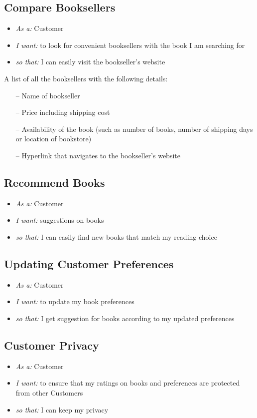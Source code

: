 \documentclass{article}
\begin{document}
\subsection{Compare Booksellers}
\begin{itemize}
\item \emph{As a:} Customer
\item \emph{I want:}  to look for convenient booksellers with the book I am searching for
\item \emph{so that:}  I can easily visit the bookseller’s website
\end{itemize}


A list of all the booksellers with the following details:
\begin{itemize}
	\item[--] Name of bookseller
	\item[--] Price including shipping cost
	\item[--] Availability of the book (such as number of books, number of shipping days or location of bookstore)
	\item[--]  Hyperlink that navigates to the bookseller’s website
\end{itemize}

\subsection{Recommend Books}
\begin{itemize}
\item \emph{As a:} Customer
\item \emph{I want:} suggestions on books 
\item \emph{so that:} I can easily find new books that match my reading choice
\end{itemize}

\subsection{Updating Customer Preferences}
\begin{itemize}
\item \emph{As a:} Customer
\item \emph{I want:} to update my book preferences 
\item \emph{so that:} I get suggestion for books according to my updated preferences
\end{itemize}

\subsection{Customer Privacy}
\begin{itemize}
\item \emph{As a:} Customer
\item \emph{I want:}  to ensure that my ratings on books and preferences are protected from other Customers
\item \emph{so that:} I can keep my privacy
\end{itemize}
\end{document}
